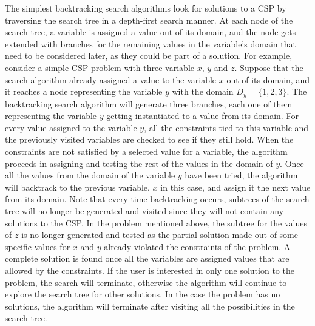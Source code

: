 \documentclass{l4proj}
\begin{document}
\noindent The simplest backtracking search algorithms look for solutions to a CSP by traversing the search tree in a depth-first search manner. At each node of the search tree, a variable is assigned a value out of its domain, and the node gets extended with branches for the remaining values in the variable’s domain that need to be considered later, as they could be part of a solution. For example, consider a simple CSP problem with three variable $x$, $y$ and $z$. Suppose that the search algorithm already assigned a value to the variable $x$ out of its domain, and it reaches a node representing the variable $y$ with the domain $D_y = \{1, 2, 3\}$. The backtracking search algorithm will generate three branches, each one of them representing the variable $y$ getting instantiated to a value from its domain. For every value assigned to the variable $y$, all the constraints tied to this variable and the previously visited variables are checked to see if they still hold. When the constraints are not satisfied by a selected value for a variable, the algorithm proceeds in assigning and testing the rest of the values in the domain of $y$. Once all the values from the domain of the variable $y$ have been tried, the algorithm will backtrack to the previous variable, $x$ in this case, and assign it the next value from its domain. Note that every time backtracking occurs, subtrees of the search tree will no longer be generated and visited since they will not contain any solutions to the CSP. In the problem mentioned above, the subtree for the values of $z$ is no longer generated and tested as the partial solution made out of some specific values for $x$ and $y$ already violated the constraints of the problem. A complete solution is found once all the variables are assigned values that are allowed by the constraints. If the user is interested in only one solution to the problem, the search will terminate, otherwise the algorithm will continue to explore the search tree for other solutions. In the case the problem has no solutions, the algorithm will terminate after visiting all the possibilities in the search tree.
\end{document}
